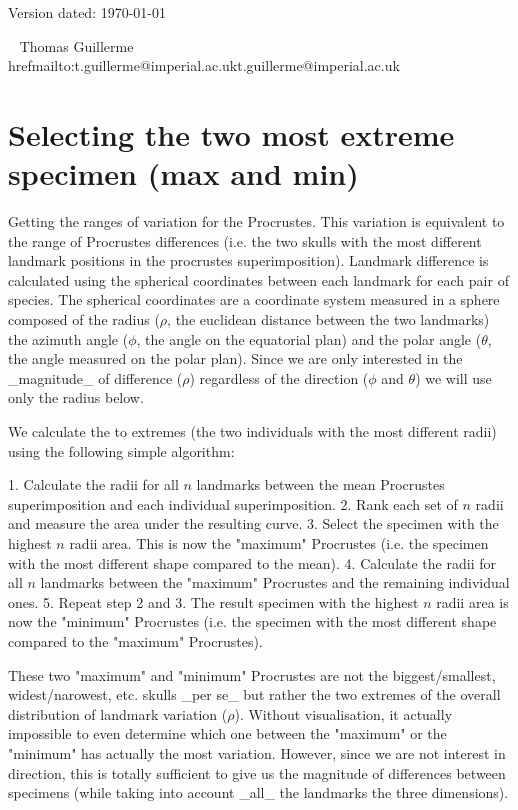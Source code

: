 \documentclass[a4paper,11pt]{article}
\begin{document}
\begin{flushright}
Version dated: \today
\end{flushright}
\begin{center}

\
\bigskip
Thomas Guillerme\\href{mailto:t.guillerme@imperial.ac.uk}{t.guillerme@imperial.ac.uk}

\end{center}


\section{Selecting the two most extreme specimen (max and min)}

Getting the ranges of variation for the Procrustes.
This variation is equivalent to the range of Procrustes differences (i.e. the two skulls with the most different landmark positions in the procrustes superimposition).
Landmark difference is calculated using the spherical coordinates between each landmark for each pair of species.
The spherical coordinates are a coordinate system measured in a sphere composed of the radius ($\rho$, the euclidean distance between the two landmarks) the azimuth angle ($\phi$, the angle on the equatorial plan) and the polar angle ($\theta$, the angle measured on the polar plan).
Since we are only interested in the _magnitude_ of difference ($\rho$) regardless of the direction ($\phi$ and $\theta$) we will use only the radius below.

We calculate the to extremes (the two individuals with the most different radii) using the following simple algorithm:

 1. Calculate the radii for all $n$ landmarks between the mean Procrustes superimposition and each individual superimposition.
 2. Rank each set of $n$ radii and measure the area under the resulting curve.
 3. Select the specimen with the highest $n$ radii area. This is now the "maximum" Procrustes (i.e. the specimen with the most different shape compared to the mean).
 4. Calculate the radii for all $n$ landmarks between the "maximum" Procrustes and the remaining individual ones.
 5. Repeat step 2 and 3. The result specimen with the highest $n$ radii area is now the "minimum" Procrustes (i.e. the specimen with the most different shape compared to the "maximum" Procrustes).

These two "maximum" and "minimum" Procrustes are not the biggest/smallest, widest/narowest, etc. skulls _per se_ but rather the two extremes of the overall distribution of landmark variation ($\rho$).
Without visualisation, it actually impossible to even determine which one between the "maximum" or the "minimum" has actually the most variation.
However, since we are not interest in direction, this is totally sufficient to give us the magnitude of differences between specimens (while taking into account _all_ the landmarks the three dimensions).
\end{document}
